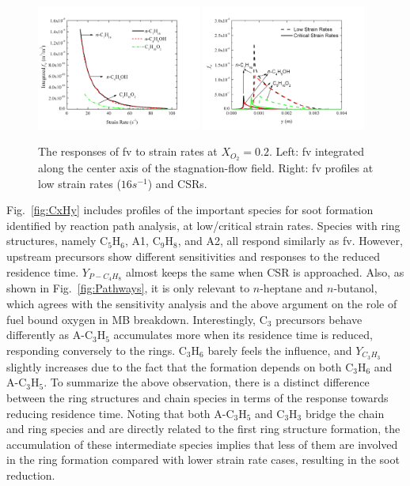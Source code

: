 \documentclass[preprint,3p,times,twocolumn]{elsarticleUS}
\begin{document}
\begin{figure}[ht]
  \centering
  \scriptsize
  \includegraphics[trim=4mm 8mm 30mm 20mm, clip=true, width=0.48\textwidth]{SV-SR.png}
  \includegraphics[trim=4mm 8mm 30mm 20mm, clip=true, width=0.48\textwidth]{fv-y.png}
  \normalsize
  \vspace{-0.2in}
  \caption{The responses of fv to strain rates at $X_{O_2}=0.2$. Left: fv integrated along the center axis of the stagnation-flow field. Right: fv profiles at low strain rates ($16 s^{-1}$) and CSRs.}
  \label{fig:fv-SR-combo}
\end{figure}

Fig.~\ref{fig:CxHy} includes profiles of the important species for soot formation identified by reaction path analysis, at low/critical strain rates. Species with ring structures, namely C$_5$H$_6$, A1, C$_9$H$_8$, and A2, all respond similarly as fv. However, upstream precursors show different sensitivities and responses to the reduced residence time. $Y_{P-C_4H_8}$ almost keeps the same when CSR is approached. Also, as shown in Fig.~\ref{fig:Pathways}, it is only relevant to $n$-heptane and $n$-butanol, which agrees with the sensitivity analysis and the above argument on the role of fuel bound oxygen in MB breakdown. Interestingly, C$_3$ precursors behave differently as A-C$_3$H$_5$ accumulates more when its residence time is reduced, responding conversely to the rings. C$_3$H$_6$ barely feels the influence, and $Y_{C_3H_3}$ slightly increases due to the fact that the formation depends on both C$_3$H$_6$ and A-C$_3$H$_5$. To summarize the above observation, there is a distinct difference between the ring structures and chain species in terms of the response towards reducing residence time. Noting that both A-C$_3$H$_5$ and C$_3$H$_3$ bridge the chain and ring species and are directly related to the first ring structure formation, the accumulation of these intermediate species implies that less of them are involved in the ring formation compared with lower strain rate cases, resulting in the soot reduction.
\end{document}
